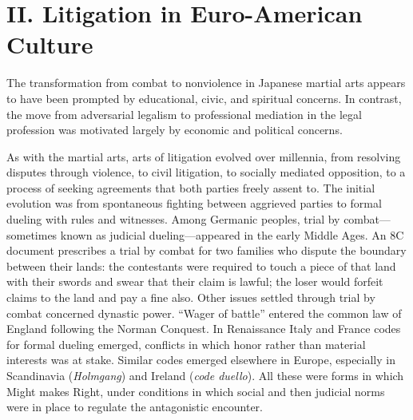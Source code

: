 \section*{II. Litigation in Euro-American Culture}

The transformation from combat to nonviolence in Japanese martial arts appears to have been prompted by educational, civic, and spiritual concerns. In contrast, the move from adversarial legalism to professional mediation in the legal profession was motivated largely by economic and political concerns.

As with the martial arts, arts of litigation evolved over millennia, from resolving disputes through violence, to civil litigation, to socially mediated opposition, to a process of seeking agreements that both parties freely assent to. The initial evolution was from spontaneous fighting between aggrieved parties to formal dueling with rules and witnesses. Among Germanic peoples, trial by combat---sometimes known as judicial dueling---appeared in the early Middle Ages. An 8C document prescribes a trial by combat for two families who dispute the boundary between their lands: the contestants were required to touch a piece of that land with their swords and swear that their claim is lawful; the loser would forfeit claims to the land and pay a fine also. Other issues settled through trial by combat concerned dynastic power. ``Wager of battle'' entered the common law of England following the Norman Conquest. In Renaissance Italy and France codes for formal dueling emerged, conflicts in which honor rather than material interests was at stake. Similar codes emerged elsewhere in Europe, especially in Scandinavia (\emph{Holmgang}) and Ireland (\emph{code duello}). All these were forms in which Might makes Right, under conditions in which social and then judicial norms were in place to regulate the antagonistic encounter. 

